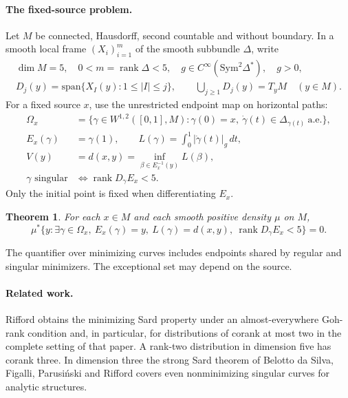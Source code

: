 \documentclass[11pt,letterpaper]{article}
\newcounter{proofgroup}
\newtheorem{theorem}{Theorem}[proofgroup]
\newcommand{\rank}{\operatorname{rank}}
\begin{document}
\paragraph{The fixed-source problem.}
Let $M$ be connected, Hausdorff, second countable and without boundary.
In a smooth local frame $(X_i)_{i=1}^m$ of the smooth subbundle $\Delta$, write
\[
 \begin{gathered}
 \dim M=5,\quad 0<m=\rank\Delta<5,\quad g\in C^\infty(\mathrm{Sym}^2\Delta^*),\quad g>0,\\
 D_j(y)=\mathrm{span}\{X_I(y):1\le |I|\le j\},\qquad
 \bigcup_{j\ge1}D_j(y)=T_yM\quad(y\in M).
 \end{gathered}
\]
For a fixed source $x$, use the unrestricted endpoint map on horizontal paths:
\[
 \begin{aligned}
 \Omega_x&=\{\gamma\in W^{1,2}([0,1],M):\gamma(0)=x,\
           \dot\gamma(t)\in\Delta_{\gamma(t)}\ \text{a.e.}\},\\
 E_x(\gamma)&=\gamma(1),\qquad L(\gamma)=\int_0^1|\dot\gamma(t)|_g\,dt,\\
 V(y)&=d(x,y)=\inf_{\beta\in E_x^{-1}(y)} L(\beta),\\
 \gamma\text{ singular}&\iff \rank D_\gamma E_x<5 .
 \end{aligned}
\]
Only the initial point is fixed when differentiating $E_x$.
\begin{theorem}\label{main}
For each $x\in M$ and each smooth positive density $\mu$ on $M$,
\[
 \mu^*\{y:\exists\gamma\in\Omega_x,\ E_x(\gamma)=y,\ 
 L(\gamma)=d(x,y),\ \rank D_\gamma E_x<5\}=0 .
\]
\end{theorem}
The quantifier over minimizing curves includes endpoints shared by regular and
singular minimizers. The exceptional set may depend on the source.
\paragraph{Related work.} Rifford
\cite{rifford} obtains the minimizing Sard property under an almost-everywhere
Goh-rank condition and, in particular, for distributions of corank at most
two in the complete setting of that paper. A rank-two distribution in dimension
five has corank three. In dimension three the strong Sard theorem of
Belotto da Silva, Figalli, Parusi\'nski and Rifford \cite{strong} covers even
nonminimizing singular curves for analytic structures.
\end{document}
